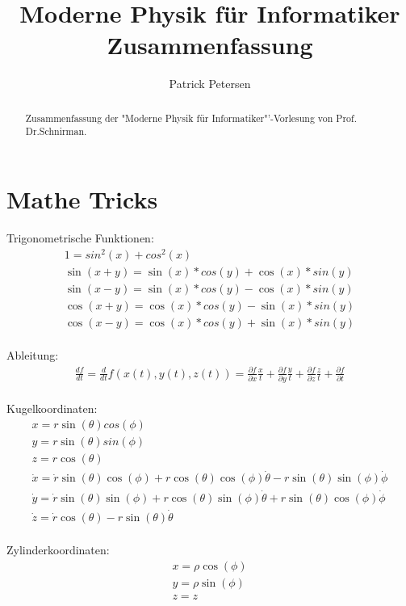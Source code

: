 \documentclass[10pt,a4paper]{article}
\author{Patrick Petersen}
\title{Moderne Physik für Informatiker Zusammenfassung}
\begin{document}
\maketitle

\begin{abstract}
Zusammenfassung der "Moderne Physik für Informatiker"'-Vorlesung von Prof. Dr.Schnirman.
\end{abstract}

\setcounter{tocdepth}{3}


\newpage
\tableofcontents


\newpage

\section{Mathe Tricks}

Trigonometrische Funktionen:
\begin{eqnarray}
1=sin^2(x)+cos^2(x)\\
\sin(x+y) = \sin(x)*cos(y) + \cos(x)*sin(y)\\
\sin(x-y) = \sin(x)*cos(y) - \cos(x)*sin(y)\\
\cos(x+y) = \cos(x)*cos(y) - \sin(x)*sin(y)\\
\cos(x-y) = \cos(x)*cos(y) + \sin(x)*sin(y)
\end{eqnarray}
%
\\
Ableitung:
\begin{eqnarray}
\frac{df}{dt} = \frac{d}{dt} f(x(t),y(t),z(t))=  \frac{\partial f}{\partial x} \frac{x}{t} + \frac{\partial f}{\partial y} \frac{y}{t} + \frac{\partial f}{\partial z} \frac{z}{t} + \frac{\partial f}{\partial t}
\end{eqnarray}
%
\\
Kugelkoordinaten:
\begin{eqnarray}
x = r \sin(\theta)cos(\phi)\\
y = r \sin(\theta)sin(\phi)\\
z = r \cos(\theta)\\
\dot{x} =\dot{r}\sin(\theta)\cos(\phi)+r\cos(\theta)\cos(\phi)\dot{\theta }-r\sin(\theta)\sin(\phi)\dot{\phi}\\
\dot{y} = \dot{r}\sin(\theta)\sin(\phi)+r\cos(\theta)\sin(\phi)\dot{\theta }+r\sin(\theta)\cos(\phi)\dot{\phi}\\
\dot{z}= \dot{r}\cos(\theta)-r\sin(\theta)\dot{\theta}
\end{eqnarray}
%
\\
Zylinderkoordinaten:
\begin{eqnarray}
x = \rho \cos(\phi)\\
y = \rho \sin(\phi)\\
z = z
\end{eqnarray}
\end{document}
